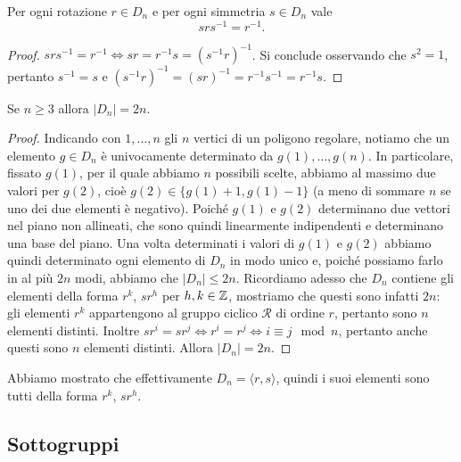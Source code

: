 \documentclass[11pt]{scrartcl}
\begin{document}
\begin{lemma}
    \label{lemma1.0}
    Per ogni rotazione $r \in D_n$ e per ogni simmetria $s \in D_n$ vale
    \[srs^{-1} = r^{-1}.\]
\end{lemma}

\begin{proof}
    $srs^{-1} = r^{-1} \iff sr = r^{-1}s = (s^{-1}r)^{-1}$. Si conclude
    osservando che $s^2 = 1$, pertanto $s^{-1} = s$ e $(s^{-1}r)^{-1} =
    (sr)^{-1} = r^{-1}s^{-1} = r^{-1}s$.
\end{proof}

\begin{proposition}
    \label{prop2.0}
    Se $n \geq 3$ allora $|D_n| = 2n$.
\end{proposition}

\begin{proof}
    Indicando con $1, \dots, n$ gli $n$ vertici di un poligono regolare, notiamo
    che un elemento $g \in D_n$ è univocamente determinato da $g(1), \dots, g(n)$.
    In particolare, fissato $g(1)$, per il quale abbiamo $n$ possibili scelte,
    abbiamo al massimo due valori per $g(2)$, cioè $g(2) \in \{g(1) + 1, g(1) - 1\}$
    (a meno di sommare $n$ se uno dei due elementi è negativo). Poiché $g(1)$
    e $g(2)$ determinano due vettori nel piano non allineati, che sono quindi
    linearmente indipendenti e determinano una base del piano. Una volta 
    determinati i valori di $g(1)$ e $g(2)$ abbiamo quindi determinato ogni
    elemento di $D_n$ in modo unico e, poiché possiamo farlo in al più $2n$ modi, 
    abbiamo che $|D_n| \leq 2n$. Ricordiamo adesso che $D_n$ contiene gli elementi
    della forma $r^k$, $sr^h$ per $h, k \in \mathbb Z$, mostriamo che questi sono 
    infatti $2n$: gli elementi $r^k$ appartengono al gruppo ciclico $\mathcal{R}$
    di ordine $r$, pertanto sono $n$ elementi distinti. Inoltre $sr^i = sr^j
    \iff r^i = r^j\iff i \equiv j \mod n$, pertanto anche questi sono $n$
    elementi distinti. Allora $|D_n| = 2n$.
\end{proof}

\begin{remark}
    Abbiamo mostrato che effettivamente $D_n = \langle r, s\rangle$, quindi i
    suoi elementi sono tutti della forma $r^k$, $sr^h$. 
\end{remark}


\subsection{Sottogruppi}
\end{document}
